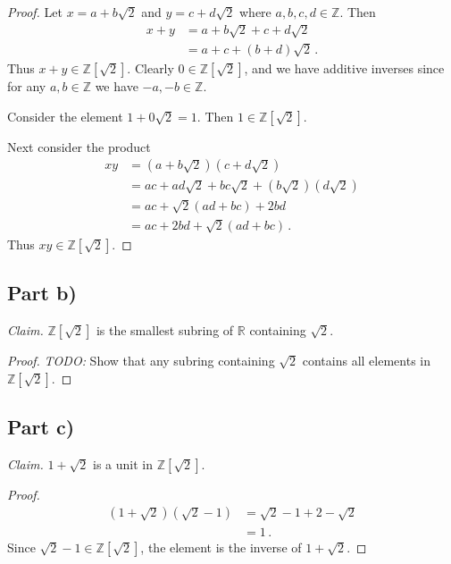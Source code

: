 \documentclass{abrice}
\newcommand{\Z}{\mathbb{Z}}
\newcommand{\R}{\mathbb{R}}
\begin{document}
\begin{proof}
  Let $x = a + b\sqrt 2$ and $y = c + d\sqrt{2}$ where $a,b,c,d \in \Z$. Then
  \begin{align*}
    x + y
    &= a + b\sqrt 2 + c + d\sqrt 2 \\
    &= a + c + (b + d)\sqrt 2\, .
  \end{align*}
  Thus $x + y \in \Z[\sqrt 2]$. Clearly $0 \in \Z[\sqrt 2]$, and we have
  additive inverses since for any $a,b \in \Z$ we have $-a, -b \in \Z$.

  Consider the element $1 + 0 \sqrt 2 = 1$. Then $1 \in \Z[\sqrt 2]$.

  Next consider the product
  \begin{align*}
    xy
    &= (a + b\sqrt 2) (c + d \sqrt 2) \\
    &= a c + a d \sqrt 2 + b c \sqrt 2 + (b \sqrt 2)(d \sqrt 2) \\
    &= a c + \sqrt 2 (ad + bc) + 2bd \\
    & = ac + 2bd + \sqrt 2(ad + bc)\, .
  \end{align*}
  Thus $xy \in \Z[\sqrt 2]$.
\end{proof}

\subsection{Part b)}

\emph{Claim.} $\Z[\sqrt 2]$ is the smallest subring of $\R$ containing $\sqrt
2$.

\begin{proof}
  \emph{TODO:} Show that any subring containing $\sqrt 2$ contains all elements
  in $\Z[\sqrt 2]$.
\end{proof}

\subsection{Part c)}

\emph{Claim.} $1 + \sqrt 2$ is a unit in $\Z[\sqrt 2]$.

\begin{proof}
  \begin{align*}
    (1 + \sqrt 2)(\sqrt 2 - 1)
    &= \sqrt 2 - 1 + 2 - \sqrt 2 \\
    &= 1\, .
  \end{align*}
  Since $\sqrt 2 - 1 \in \Z[\sqrt 2]$, the element is the inverse of $1 + \sqrt 2$.
\end{proof}
\end{document}
